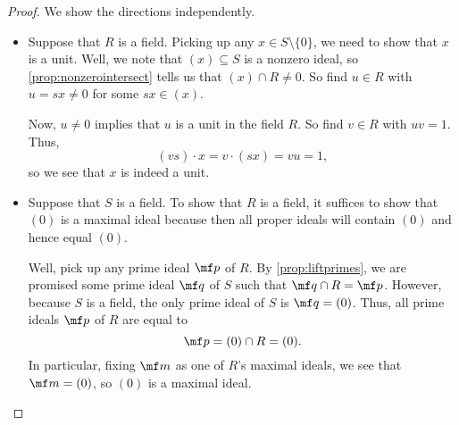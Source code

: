 \begin{proof}
	We show the directions independently.
	\begin{itemize}
		\item Suppose that $R$ is a field. Picking up any $x\in S\setminus\{0\}$, we need to show that $x$ is a unit. Well, we note that $(x)\subseteq S$ is a nonzero ideal, so \autoref{prop:nonzerointersect} tells us that $(x)\cap R\ne0$. So find $u\in R$ with $u=sx\ne0$ for some $sx\in(x)$.

		Now, $u\ne0$ implies that $u$ is a unit in the field $R$. So find $v\in R$ with $uv=1$. Thus,
		\[(vs)\cdot x=v\cdot(sx)=vu=1,\]
		so we see that $x$ is indeed a unit.

		\item Suppose that $S$ is a field. To show that $R$ is a field, it suffices to show that $(0)$ is a maximal ideal because then all proper ideals will contain $(0)$ and hence equal $(0)$.
		
		Well, pick up any prime ideal $\mf p$ of $R$. By \autoref{prop:liftprimes}, we are promised some prime ideal $\mf q$ of $S$ such that $\mf q\cap R=\mf p$. However, because $S$ is a field, the only prime ideal of $S$ is $\mf q=(0)$. Thus, all prime ideals $\mf p$ of $R$ are equal to
		\[\mf p=(0)\cap R=(0).\]
		In particular, fixing $\mf m$ as one of $R$'s maximal ideals, we see that $\mf m=(0)$, so $(0)$ is a maximal ideal.
		\qedhere
	\end{itemize}
\end{proof}